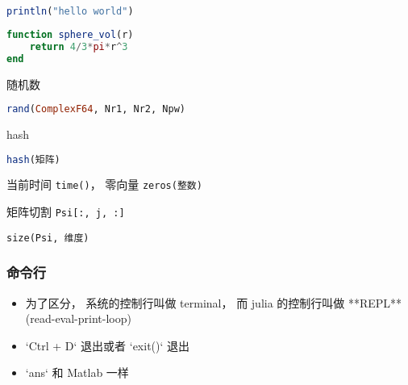 
\begin{issues}
\issueDraft
\end{issues}

\begin{lstlisting}[language=julia]
println("hello world")
\end{lstlisting}

\begin{lstlisting}[language=julia]
function sphere_vol(r)
    return 4/3*pi*r^3
end
\end{lstlisting}

随机数
\begin{lstlisting}[language=julia]
rand(ComplexF64, Nr1, Nr2, Npw)
\end{lstlisting}

hash
\begin{lstlisting}[language=julia]
hash(矩阵)
\end{lstlisting}

当前时间 \verb|time()|， 零向量 \verb|zeros(整数)|

矩阵切割 \verb|Psi[:, j, :]|

\verb|size(Psi, 维度)|



\subsubsection{命令行}
\begin{itemize}
\item 为了区分， 系统的控制行叫做 terminal， 而 julia 的控制行叫做 **REPL** (read-eval-print-loop)
\item `Ctrl + D` 退出或者 `exit()` 退出
\item `ans` 和 Matlab 一样
\end{itemize}

\subsubsection{}
